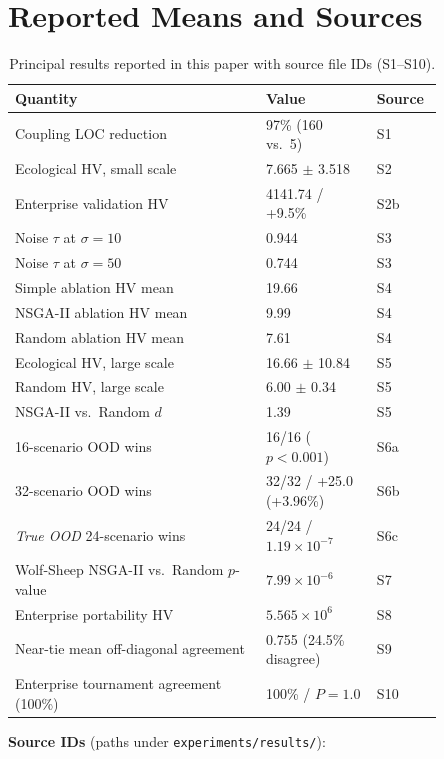 \documentclass{wscpaperproc}
\begin{document}
\appendix
\section{Reported Means and Sources}

\begin{table}[ht]
\caption{Principal results reported in this paper with source file IDs (S1--S10).}
\label{tab:appendix-results}
\centering\small
\begin{tabular}{p{0.52\linewidth}p{0.23\linewidth}p{0.1\linewidth}}
\toprule
Quantity & Value & Source \\
\midrule
Coupling LOC reduction & 97\% (160 vs.\ 5) & S1 \\
Ecological HV, small scale & 7.665 $\pm$ 3.518 & S2 \\
Enterprise validation HV & 4141.74 / +9.5\% & S2b \\
Noise $\tau$ at $\sigma\!=\!10$ & 0.944 & S3 \\
Noise $\tau$ at $\sigma\!=\!50$ & 0.744 & S3 \\
Simple ablation HV mean & 19.66 & S4 \\
NSGA-II ablation HV mean & 9.99 & S4 \\
Random ablation HV mean & 7.61 & S4 \\
\midrule
Ecological HV, large scale & 16.66 $\pm$ 10.84 & S5 \\
Random HV, large scale & 6.00 $\pm$ 0.34 & S5 \\
NSGA-II vs.\ Random $d$ & 1.39 & S5 \\
16-scenario OOD wins & 16/16 ($p\!<\!0.001$) & S6a \\
32-scenario OOD wins & 32/32 / +25.0 (+3.96\%) & S6b \\
\textit{True OOD} 24-scenario wins & 24/24 / $1.19\!\times\!10^{-7}$ & S6c \\
Wolf-Sheep NSGA-II vs.\ Random $p$-value & $7.99\!\times\!10^{-6}$ & S7 \\
Enterprise portability HV & $5.565\!\times\!10^{6}$ & S8 \\
Near-tie mean off-diagonal agreement & 0.755 (24.5\% disagree) & S9 \\
Enterprise tournament agreement (100\%) & 100\% / $P\!=\!1.0$ & S10 \\
\bottomrule
\end{tabular}
\end{table}

\noindent\textbf{Source IDs} (paths under \texttt{experiments/results/}):
\end{document}
